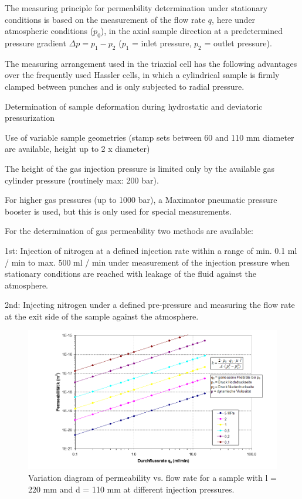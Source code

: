 The measuring principle for permeability determination under stationary conditions is based on the measurement of the flow rate $q$, here under atmospheric conditions ($p_0$), in the axial sample direction at a predetermined pressure gradient $\Delta p = p_1 - p_2$ ($p_1$ = inlet pressure, $p_2$ = outlet pressure).

The measuring arrangement used in the triaxial cell has the following advantages over the frequently used Hassler cells, in which a cylindrical sample is firmly clamped between punches and is only subjected to radial pressure.

\begin{list}{-}{\leftmargin=1em \itemindent=0em \itemsep=0em}
\item Determination of sample deformation during hydrostatic and deviatoric pressurization
\item Use of variable sample geometries (stamp sets between 60 and 110 mm diameter are available, height up to 2 x diameter)
\item The height of the gas injection pressure is limited only by the available gas cylinder pressure (routinely max: 200 bar).
\item For higher gas pressures (up to 1000 bar), a Maximator pneumatic pressure booster is used, but this is only used for special measurements.
\end{list}

For the determination of gas permeability two methods are available:
\begin{list}{-}{\leftmargin=1em \itemindent=0em \itemsep=0.1em}
\item 1st: Injection of nitrogen at a defined injection rate within a range of min. 0.1 ml / min to max. 500 ml / min under 
measurement of the injection pressure when stationary conditions are reached with leakage of the fluid against the atmosphere.
\item 2nd: Injecting nitrogen under a defined pre-pressure and measuring the flow rate at the exit side of the sample against the atmosphere.
\end{list}

\begin{figure}[!ht]
\centering
\includegraphics[width=1\textwidth]{./figures/ifg-perme-flowrate.png}
\caption{Variation diagram of permeability vs. flow rate for a sample with l = 220 mm and d = 110 mm at different injection pressures.}
\label{fig:ifgpermeflow}
\end{figure}

